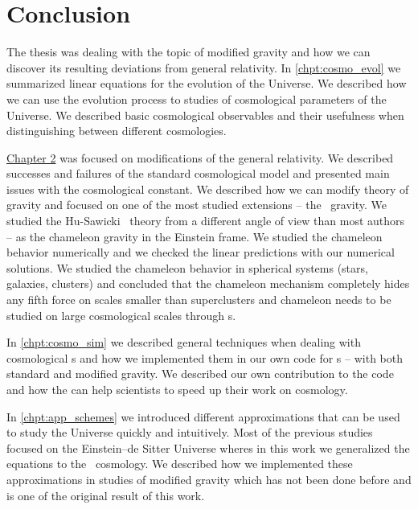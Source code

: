 \chapter*{Conclusion}
The thesis was dealing with the topic of modified gravity and how we can discover its resulting deviations from general relativity. In \autoref{chpt:cosmo_evol} we summarized linear equations for the evolution of the Universe. We described how we can use the evolution process to studies of cosmological parameters of the Universe. We described basic cosmological observables and their usefulness when distinguishing between different cosmologies.

\hyperref[chpt:de_mg]{Chapter 2} was focused on modifications of the general relativity. We described successes and failures of the standard cosmological model and presented main issues with the cosmological constant. We described how we can modify theory of gravity and focused on one of the most studied extensions -- the \fR\ gravity. We studied the Hu-Sawicki \fR\ theory from a different angle of view than most authors -- as the chameleon gravity in the Einstein frame. We studied the chameleon behavior numerically and we checked the linear predictions with our numerical solutions. We studied the chameleon behavior in spherical systems (stars, galaxies, clusters) and concluded that the chameleon mechanism completely hides any fifth force on scales smaller than superclusters and chameleon needs to be studied on large cosmological scales through \nbodysim s. 

In \autoref{chpt:cosmo_sim} we described general techniques when dealing with cosmological \nbodysim s and how we implemented them in our own code for \nbodysim s -- with both standard and modified gravity. We described our own contribution to the  code and how the  can help scientists to speed up their work on cosmology.

In \autoref{chpt:app_schemes} we introduced different approximations that can be used to study the Universe quickly and intuitively. Most of the previous studies focused on the Einstein--de Sitter Universe wheres in this work we generalized the equations to the \LCDM\ cosmology. We described how we implemented these approximations in studies of modified gravity which has not been done before and is one of the original result of this work.

